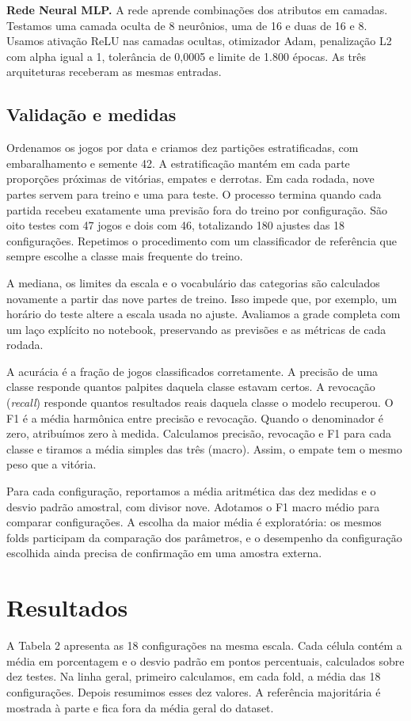 \documentclass[12pt]{article}
\begin{document}
\textbf{Rede Neural MLP.} A rede aprende combinações dos atributos em camadas. Testamos uma camada oculta de 8 neurônios, uma de 16 e duas de 16 e 8. Usamos ativação ReLU nas camadas ocultas, otimizador Adam, penalização L2 com alpha igual a 1, tolerância de 0,0005 e limite de 1.800 épocas. As três arquiteturas receberam as mesmas entradas.
\subsection{Validação e medidas}
Ordenamos os jogos por data e criamos dez partições estratificadas, com embaralhamento e semente 42. A estratificação mantém em cada parte proporções próximas de vitórias, empates e derrotas. Em cada rodada, nove partes servem para treino e uma para teste. O processo termina quando cada partida recebeu exatamente uma previsão fora do treino por configuração. São oito testes com 47 jogos e dois com 46, totalizando 180 ajustes das 18 configurações. Repetimos o procedimento com um classificador de referência que sempre escolhe a classe mais frequente do treino.

A mediana, os limites da escala e o vocabulário das categorias são calculados novamente a partir das nove partes de treino. Isso impede que, por exemplo, um horário do teste altere a escala usada no ajuste. Avaliamos a grade completa com um laço explícito no notebook, preservando as previsões e as métricas de cada rodada.

A acurácia é a fração de jogos classificados corretamente. A precisão de uma classe responde quantos palpites daquela classe estavam certos. A revocação (\textit{recall}) responde quantos resultados reais daquela classe o modelo recuperou. O F1 é a média harmônica entre precisão e revocação. Quando o denominador é zero, atribuímos zero à medida. Calculamos precisão, revocação e F1 para cada classe e tiramos a média simples das três (macro). Assim, o empate tem o mesmo peso que a vitória.

Para cada configuração, reportamos a média aritmética das dez medidas e o desvio padrão amostral, com divisor nove. Adotamos o F1 macro médio para comparar configurações. A escolha da maior média é exploratória: os mesmos folds participam da comparação dos parâmetros, e o desempenho da configuração escolhida ainda precisa de confirmação em uma amostra externa.
\clearpage
\section{Resultados}
A Tabela 2 apresenta as 18 configurações na mesma escala. Cada célula contém a média em porcentagem e o desvio padrão em pontos percentuais, calculados sobre dez testes. Na linha geral, primeiro calculamos, em cada fold, a média das 18 configurações. Depois resumimos esses dez valores. A referência majoritária é mostrada à parte e fica fora da média geral do dataset.
\end{document}
